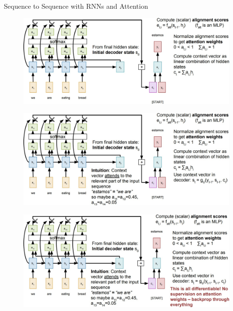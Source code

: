 \begin{frame}[allowframebreaks]{Sequence to Sequence with RNNs and Attention}
    \framebreak

    \begin{figure}
        \centering
        \includegraphics[width=1\textwidth,keepaspectratio]{images/rnn/slide_18_1_img.jpg}
    \end{figure}

    \framebreak

    \begin{figure}
        \centering
        \includegraphics[width=1\textwidth,keepaspectratio]{images/rnn/slide_19_1_img.jpg}
    \end{figure}

    \framebreak

    \begin{figure}
        \centering
        \includegraphics[width=1\textwidth,keepaspectratio]{images/rnn/slide_20_1_img.jpg}
    \end{figure}


\end{frame}
